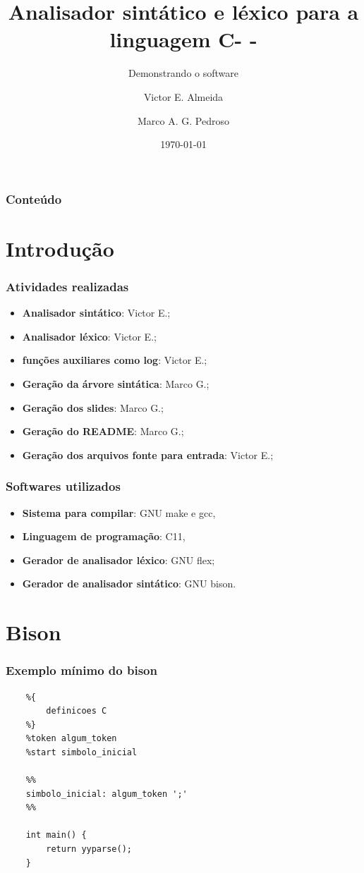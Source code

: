 \documentclass[12pt]{beamer}
\author[Grupo: c--]{Victor E. Almeida \and Marco A. G. Pedroso}
\title{Analisador sintático e léxico para a linguagem C- -}
\subtitle{Demonstrando o software}
\date{\today}
\institute{UNIOESTE}
\begin{document}
\frame{\titlepage}

\begin{frame}
\frametitle{Conteúdo}
\tableofcontents
\end{frame}

\section{Introdução}\label{Introdução}
\begin{frame}
    \frametitle{Atividades realizadas}
    \begin{itemize}
        \item\textbf{Analisador sintático}: Victor E.;
        \item\textbf{Analisador léxico}: Victor E.;
        \item\textbf{funções auxiliares como log}: Victor E.;
        \item\textbf{Geração da árvore sintática}: Marco G.;
        \item\textbf{Geração dos slides}: Marco G.;
        \item\textbf{Geração do README}: Marco G.;
        \item\textbf{Geração dos arquivos fonte para entrada}: Victor E.;
    \end{itemize}
\end{frame}
\begin{frame}
    \frametitle{Softwares utilizados}
    \begin{itemize}
        \item \textbf{Sistema para compilar}: GNU make e gcc,
        \item \textbf{Linguagem de programação}: C11,
        \item \textbf{Gerador de analisador léxico}: GNU flex;
        \item \textbf{Gerador de analisador sintático}: GNU bison.
    \end{itemize}
\end{frame}


\section{Bison}\label{Bison}
\begin{frame}[t,fragile]{\insertsectionhead}
    \frametitle{Exemplo mínimo do bison}
    \begin{lstlisting}
    %{
        definicoes C
    %}
    %token algum_token
    %start simbolo_inicial

    %%
    simbolo_inicial: algum_token ';'
    %%

    int main() {
        return yyparse();
    }
    \end{lstlisting}
\end{frame}
\end{document}
